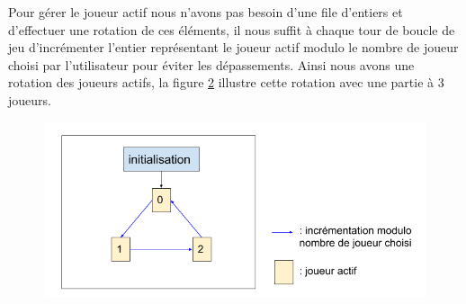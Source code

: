 \documentclass[11pt]{article}
\begin{document}
\begin{figure}[H] 
\centering
{}
\label{fig : struct joueurs}
\end{figure}

Pour gérer le joueur actif nous n'avons pas besoin d'une file d'entiers et d'effectuer une rotation de ces éléments, il nous suffit à chaque tour de boucle de jeu d'incrémenter l'entier représentant le joueur actif modulo le nombre de joueur choisi par l'utilisateur pour éviter les dépassements. Ainsi nous avons une rotation des joueurs actifs, la figure \ref{fig : joueur actif} illustre cette rotation avec une partie à 3 joueurs.
\\
\begin{figure}[H] 
\centering
\includegraphics[scale=0.5]{Joueurs actifs .png}
\label{fig : joueur actif}
\end{figure}
\end{document}
